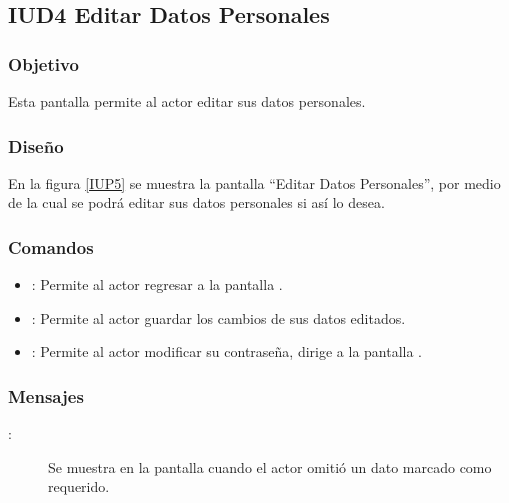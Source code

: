 \subsection{IUD4 Editar Datos Personales}
 
\subsubsection{Objetivo}

    Esta pantalla permite al actor editar sus datos personales.

\subsubsection{Diseño}

    En la figura \ref{IUP5} se muestra la pantalla ``Editar Datos Personales'', por medio de la cual se podrá editar sus datos personales si así lo desea. \\


\subsubsection{Comandos}
\begin{itemize}
    \item {}: Permite al actor regresar a la pantalla .
    \item {}: Permite al actor guardar los cambios de sus datos editados.
    \item {}: Permite al actor modificar su contraseña, dirige a la pantalla .
\end{itemize}

\subsubsection{Mensajes}

\begin{description}
    \item[:] Se muestra en la pantalla  cuando el actor omitió un dato marcado como requerido.
\end{description}
